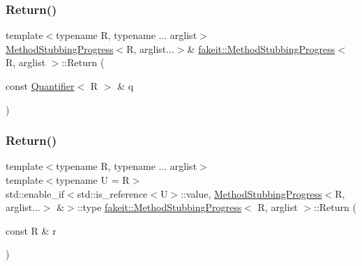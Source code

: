 \mbox{\label{structfakeit_1_1MethodStubbingProgress_acb4d4db8208a8eaadff77e7cbf3775db}} 
\subsubsection{\texorpdfstring{Return()}{Return()}\hspace{0.1cm}{\footnotesize\ttfamily [10/45]}}
{\footnotesize\ttfamily template$<$typename R, typename ... arglist$>$ \\
\mbox{\hyperlink{structfakeit_1_1MethodStubbingProgress}{Method\+Stubbing\+Progress}}$<$R, arglist...$>$\& \mbox{\hyperlink{structfakeit_1_1MethodStubbingProgress}{fakeit\+::\+Method\+Stubbing\+Progress}}$<$ R, arglist $>$\+::Return (\begin{DoxyParamCaption}\item[{const \mbox{\hyperlink{structfakeit_1_1Quantifier}{Quantifier}}$<$ R $>$ \&}]{q }\end{DoxyParamCaption})\hspace{0.3cm}{\ttfamily [inline]}}

\mbox{\label{structfakeit_1_1MethodStubbingProgress_ab20141c6f552c3aa3399660c520c2ba4}} 
\subsubsection{\texorpdfstring{Return()}{Return()}\hspace{0.1cm}{\footnotesize\ttfamily [11/45]}}
{\footnotesize\ttfamily template$<$typename R, typename ... arglist$>$ \\
template$<$typename U  = R$>$ \\
std\+::enable\+\_\+if$<$std\+::is\+\_\+reference$<$U$>$\+::value, \mbox{\hyperlink{structfakeit_1_1MethodStubbingProgress}{Method\+Stubbing\+Progress}}$<$R, arglist...$>$ \&$>$\+::type \mbox{\hyperlink{structfakeit_1_1MethodStubbingProgress}{fakeit\+::\+Method\+Stubbing\+Progress}}$<$ R, arglist $>$\+::Return (\begin{DoxyParamCaption}\item[{const R \&}]{r }\end{DoxyParamCaption})\hspace{0.3cm}{\ttfamily [inline]}}

